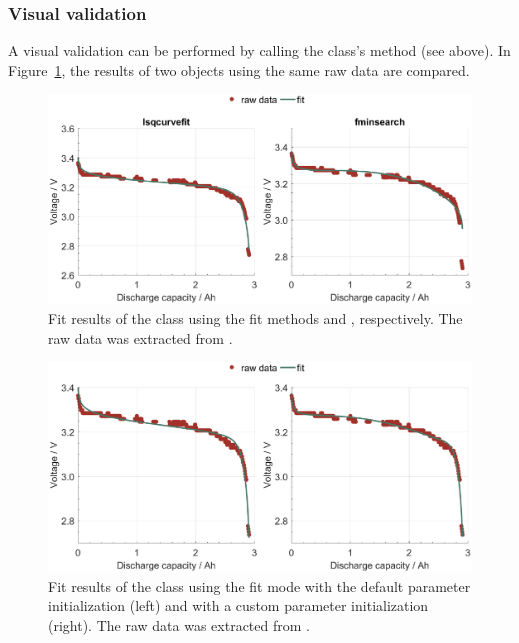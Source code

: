 \subsubsection{Visual validation}
A visual validation can be performed by calling the class's  method (see above). In Figure~\ref{fig:dischargeFit01}, the results of two  objects using the same raw data are compared.
\begin{figure}[b!]
	\captionsetup{type=figure}
	\centering
	\includegraphics[width=.97\textwidth]{dischargeFit01}
	\caption[Fit results of the  class using the fit methods  and , respectively]{Fit results of the  class using the fit methods  and , respectively. The raw data was extracted from \cite{_data_2010}.}
	\label{fig:dischargeFit01}
\end{figure}
\begin{figure}[t!]
	\captionsetup{type=figure}
	\centering
	\includegraphics[width=.97\textwidth]{dischargeFit02}
	\caption[Fit results of the  class using the fit mode  with the default parameter initialization and with a custom parameter initialization]{Fit results of the  class using the fit mode  with the default parameter initialization (left) and with a custom parameter initialization (right). The raw data was extracted from \cite{_data_2010}.}
	\label{fig:dischargeFit02}
\end{figure}

